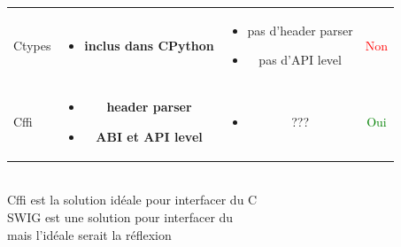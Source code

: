 \begin{frame}
\begin{center}
\begin{tabular}{lccc}
      Ctypes &
      \begin{minipage}[t]{.2\linewidth}
        \tiny
        \begin{itemize}
        \item \textbf{inclus dans CPython}
        \end{itemize}
      \end{minipage} &
      \begin{minipage}[t]{.45\linewidth}
        \tiny
        \begin{itemize}
          \item pas d'header parser
          \item pas d'API level
        \end{itemize}
      \end{minipage} &
      \textcolor{red}{Non} \\[1em]
      Cffi &
      \begin{minipage}[t]{.2\linewidth}
        \tiny
        \begin{itemize}
        \item \textbf{header parser}
        \item \textbf{ABI et API level}
        \end{itemize}
      \end{minipage} &
      \begin{minipage}[t]{.45\linewidth}
        \tiny
        \begin{itemize}
        \item ???
        \end{itemize}
      \end{minipage} &
    \textcolor{green}{Oui}
    \end{tabular} \\[2em]
    \alert{Cffi est la solution idéale pour interfacer du C} \\[.5em]
    \alert{SWIG est une solution pour interfacer du \Cpp} \\[.5em]
    \alert{mais l'idéale serait la réflexion}
  \end{center}
  \note{
    \begin{enumerate}
    \item
    \end{enumerate}
  }
\end{frame}

